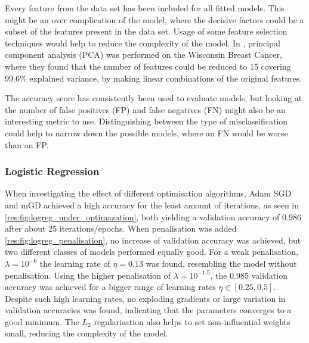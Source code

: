     Every feature from the data set has been included for all fitted models. This might be an over complication of the model, where the decisive factors could be a subset of the features present in the data set. Usage of some feature selection techniques would help to reduce the complexity of the model. In \citep{inproceedings}, principal component analysis (PCA) was performed on the Wisconsin Breast Cancer, where they found that the number of features could be reduced to 15 covering 99.6\% explained variance, by making linear combinations of the original features.

    The accuracy score has consistently been used to evaluate models, but looking at the number of false positives (FP) and false negatives (FN) might also be an interesting metric to use. Distinguishing between the type of misclassification could help to narrow down the possible models, where an FN would be worse than an FP.


    \subsubsection{Logistic Regression}
        When investigating the effect of different optimisation algorithms, Adam SGD and mGD achieved a high accuracy for the least amount of iterations, as seen in \cref{res:fig:logreg_under_optimazation}, both yielding a validation accuracy of $0.986$ after about 25 iterations/epochs. When penalisation was added \cref{res:fig:logreg_penalisation}, no increase of validation accuracy was achieved, but two different classes of models performed equally good. For a weak penalisation, $\lambda = 10^{-6}$ the learning rate of $\eta = 0.13$ was found, resembling the model without penalisation. Using the higher penalisation of $\lambda = 10^{-1.5}$, the $0.985$ validation accuracy was achieved for a bigger range of learning rates $\eta \in [0.25, 0.5]$. Despite such high learning rates, no exploding gradients or large variation in validation accuracies was found, indicating that the parameters converges to a good minimum. The $L_2$ regularisation also helps to set non-influential weights small, reducing the complexity of the model.


